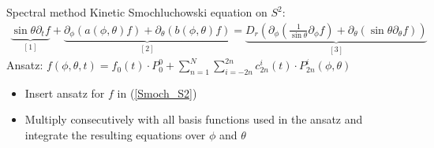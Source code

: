 \begin{comment}
\begin{frame}{Properties of harmonic polynomial basis functions}
	\scriptsize
	\begin{block}{Property 1}
		Let $P^{i}_{n}(\phi, \theta)$ and $P^{l}_{m}(\phi, \theta)$ are two different harmonic polynomial basis functions. Then
		\begin{align*}
			<P^i_n, P^l_m>_{S^2} = 0,
		\end{align*}
	for $i \neq l$ or $n \neq m$.
	\end{block}
	
	\begin{block}{Property 2}
		Let $P^i_{n}$ be the normalized harmonic polynomial basis functions. Then
		\begin{align*}
			<P^i_n, P^i_n>_{S^2} = 1.
		\end{align*}
	\end{block}

	\begin{block}{Property 3}
		The spherical harmonic function are the eigenfunctions of Laplace-Beltrami operator with the eigenvalues $(- n (n +1),n \in \mathbb{N}_0)$(see \cite{zbMATH01218597})
		\begin{align*}
			\Delta_{S^2}P^i_n = -n(n+1) P^i_n.
		\end{align*}
	\end{block}
\end{frame}
\end{comment}


\begin{frame}{Spectral method}
	\scriptsize
	Kinetic Smochluchowski equation on $S^2$:
	\begin{align}
		\underbrace{\sin \theta \partial_t f}_{[1]} + \underbrace{\partial_\phi\left(a(\phi, \theta) f\right)+\partial_\theta\left(b(\phi, \theta) f\right)}_{[2]} = \underbrace{D_r \left(\partial_\phi\left(\frac{1}{\sin \theta} \partial_\phi f\right)+\partial_\theta\left(\sin \theta \partial_\theta f\right)\right)}_{[3]} \label{Smoch_S2}
	\end{align}	
	Ansatz: $f(\phi, \theta, t) = f_0(t) \cdot P_0^0 + \sum_{n=1}^{N} \sum_{i=-2n}^{2n} c^i_{2n}(t) \cdot P^i_{2n}(\phi, \theta)$
 	\vspace{12pt}
 	\begin{itemize}
 		\item Insert ansatz for $f$ in (\ref{Smoch_S2}) 
 		\item Multiply consecutively with all basis functions used in the ansatz and integrate the resulting equations over $\phi$ and $\theta$
 	\end{itemize}
\end{frame}

